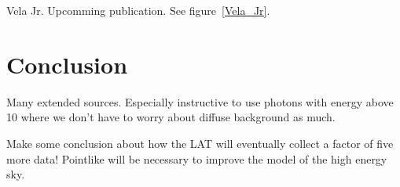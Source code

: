 \documentclass[12pt,preprint]{aastex}
\newcommand{\gev}{\text{GeV}\xspace}
\begin{document}


Vela Jr. Upcomming publication.
See figure~\ref{Vela_Jr}.

\section{Conclusion}


Many extended sources. Especially instructive to
use photons with energy above 10 \gev where we don't have
to worry about diffuse background as much.

Make some conclusion about how the LAT will eventually collect a factor
of five more data! Pointlike will be necessary to improve the model of the
high energy sky.




\appendix
\end{document}
